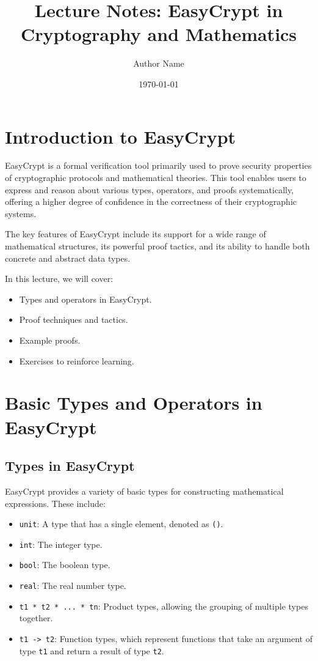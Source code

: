 \documentclass{article}
\title{Lecture Notes: EasyCrypt in Cryptography and Mathematics}
\author{Author Name}
\date{\today}
\begin{document}
	\maketitle
	
	\section{Introduction to EasyCrypt}
	
	EasyCrypt is a formal verification tool primarily used to prove security properties of cryptographic protocols and mathematical theories. This tool enables users to express and reason about various types, operators, and proofs systematically, offering a higher degree of confidence in the correctness of their cryptographic systems.
	
	The key features of EasyCrypt include its support for a wide range of mathematical structures, its powerful proof tactics, and its ability to handle both concrete and abstract data types.
	
	In this lecture, we will cover:
	\begin{itemize}
		\item Types and operators in EasyCrypt.
		\item Proof techniques and tactics.
		\item Example proofs.
		\item Exercises to reinforce learning.
	\end{itemize}
	
	\section{Basic Types and Operators in EasyCrypt}
	
	\subsection{Types in EasyCrypt}
	
	EasyCrypt provides a variety of basic types for constructing mathematical expressions. These include:
	\begin{itemize}
		\item \texttt{unit}: A type that has a single element, denoted as \texttt{()}.
		\item \texttt{int}: The integer type.
		\item \texttt{bool}: The boolean type.
		\item \texttt{real}: The real number type.
		\item \texttt{t1 * t2 * ... * tn}: Product types, allowing the grouping of multiple types together.
		\item \texttt{t1 -> t2}: Function types, which represent functions that take an argument of type \texttt{t1} and return a result of type \texttt{t2}.
	\end{itemize}
	
\end{document}
